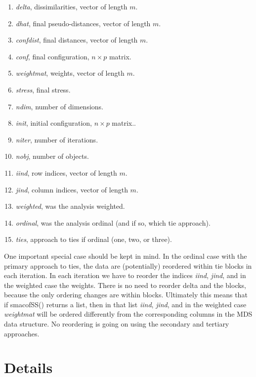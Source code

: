 \documentclass[
  12pt,
  letterpaper,
  DIV=11,
  numbers=noendperiod]{scrartcl}
\providecommand{\tightlist}{%
  \setlength{\itemsep}{0pt}\setlength{\parskip}{0pt}}
\begin{document}
\begin{enumerate}
\def\labelenumi{\arabic{enumi}.}
\tightlist
\item
  \emph{delta}, dissimilarities, vector of length \(m\).
\item
  \emph{dhat}, final pseudo-distances, vector of length \(m\).
\item
  \emph{confdist}, final distances, vector of length \(m\).
\item
  \emph{conf}, final configuration, \(n \times p\) matrix.
\item
  \emph{weightmat}, weights, vector of length \(m\).
\item
  \emph{stress}, final stress.
\item
  \emph{ndim}, number of dimensions.
\item
  \emph{init}, initial configuration, \(n \times p\) matrix..
\item
  \emph{niter}, number of iterations.
\item
  \emph{nobj}, number of objects.
\item
  \emph{iind}, row indices, vector of length \(m\).
\item
  \emph{jind}, column indices, vector of length \(m\).
\item
  \emph{weighted}, was the analysis weighted.
\item
  \emph{ordinal}, was the analysis ordinal (and if so, which tie
  approach).
\item
  \emph{ties}, approach to ties if ordinal (one, two, or three).
\end{enumerate}

One important special case should be kept in mind. In the ordinal case
with the primary approach to ties, the data are (potentially) reordered
within tie blocks in each iteration. In each iteration we have to
reorder the indices \emph{iind}, \emph{jind}, and in the weighted case
the weights. There is no need to reorder delta and the blocks, because
the only ordering changes are within blocks. Ultimately this means that
if smacofSS() returns a list, then in that list \emph{iind},
\emph{jind}, and in the weighted case \emph{weightmat} will be ordered
differently from the corresponding columns in the MDS data structure. No
reordering is going on using the secondary and tertiary approaches.

\section{Details}\label{sec-details}
\end{document}
